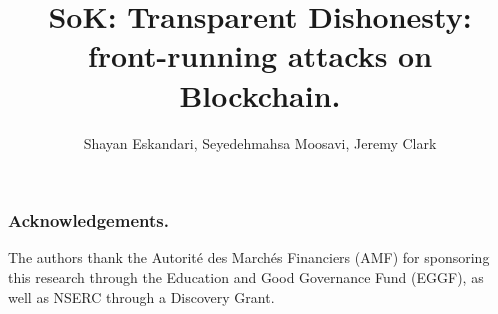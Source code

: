 \documentclass[envcountsect]{llncs}
\begin{document}
\frontmatter
\mainmatter

\title{SoK: Transparent Dishonesty: front-running attacks on Blockchain.}

\author{
	Shayan Eskandari\inst{\dag\ddag},
	Seyedehmahsa Moosavi\inst{\dag},
	Jeremy Clark\inst{\dag}
	}

	
	
\maketitle








\subsubsection*{Acknowledgements.}
The authors thank the Autorit\'e des March\'es Financiers (AMF) for sponsoring this research through the Education and Good Governance Fund (EGGF), as well as NSERC through a Discovery Grant. 






\end{document}
